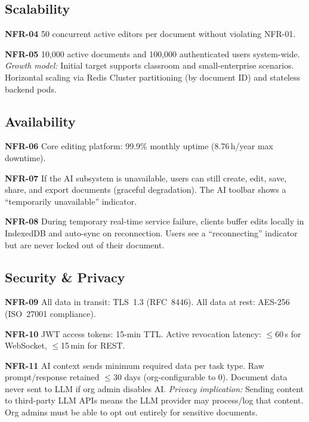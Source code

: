 \documentclass[10pt, a4paper]{article}
\newcommand{\requirement}[1]{\textcolor{accent}{\textsf{\textbf{#1}}}}
\begin{document}
\subsection{Scalability}
\begin{speclist}
\item \requirement{NFR-04} 50 concurrent active editors per document without violating NFR-01.
\item \requirement{NFR-05} 10,000 active documents and 100,000 authenticated users system-wide. \textit{Growth model:} Initial target supports classroom and small-enterprise scenarios. Horizontal scaling via Redis Cluster partitioning (by document ID) and stateless backend pods.
\end{speclist}

\subsection{Availability}
\begin{speclist}
\item \requirement{NFR-06} Core editing platform: 99.9\% monthly uptime (8.76\,h/year max downtime).
\item \requirement{NFR-07} If the AI subsystem is unavailable, users can still create, edit, save, share, and export documents (graceful degradation). The AI toolbar shows a ``temporarily unavailable'' indicator.
\item \requirement{NFR-08} During temporary real-time service failure, clients buffer edits locally in IndexedDB and auto-sync on reconnection. Users see a ``reconnecting'' indicator but are never locked out of their document.
\end{speclist}

\subsection{Security \& Privacy}
\begin{speclist}
\item \requirement{NFR-09} All data in transit: TLS~1.3 (RFC~8446). All data at rest: AES-256 (ISO~27001 compliance).
\item \requirement{NFR-10} JWT access tokens: 15-min TTL. Active revocation latency: $\le$60\,s for WebSocket, $\le$15\,min for REST.
\item \requirement{NFR-11} AI context sends minimum required data per task type. Raw prompt/response retained $\le$30 days (org-configurable to 0). Document data never sent to LLM if org admin disables AI. \textit{Privacy implication:} Sending content to third-party LLM APIs means the LLM provider may process/log that content. Org admins must be able to opt out entirely for sensitive documents.
\end{speclist}
\end{document}
